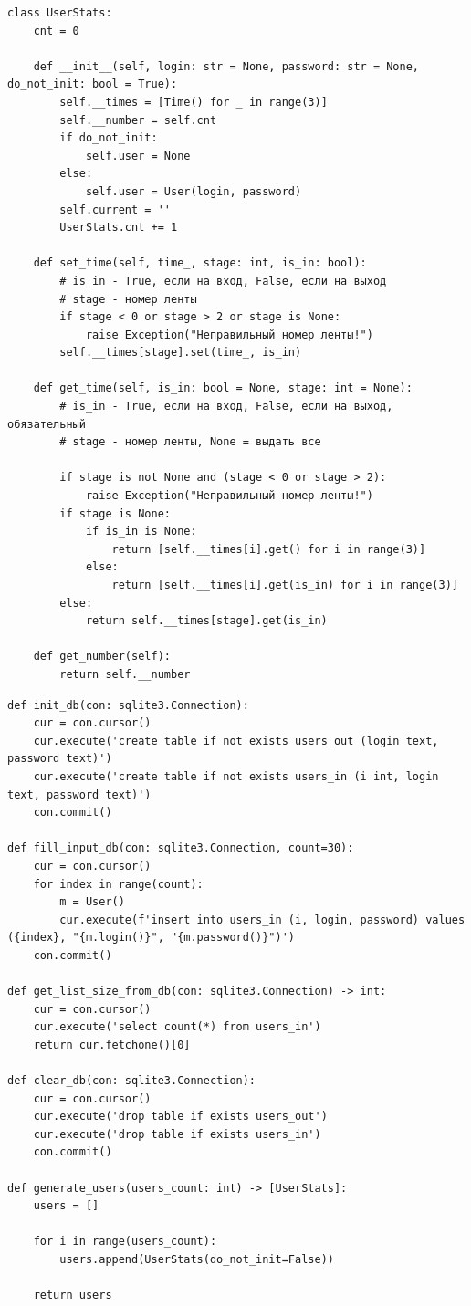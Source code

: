 \documentclass[a4paper,oneside,14pt]{extreport}
\begin{document}
\newpage
\begin{lstlisting}[caption=Класс UserStats]
class UserStats:
	cnt = 0

	def __init__(self, login: str = None, password: str = None, 	do_not_init: bool = True):
		self.__times = [Time() for _ in range(3)]
		self.__number = self.cnt
		if do_not_init:
			self.user = None
		else:
			self.user = User(login, password)
		self.current = ''
		UserStats.cnt += 1

	def set_time(self, time_, stage: int, is_in: bool):
		# is_in - True, если на вход, False, если на выход
		# stage - номер ленты
		if stage < 0 or stage > 2 or stage is None:
			raise Exception("Неправильный номер ленты!")
		self.__times[stage].set(time_, is_in)

	def get_time(self, is_in: bool = None, stage: int = None):
		# is_in - True, если на вход, False, если на выход, обязательный
		# stage - номер ленты, None = выдать все

		if stage is not None and (stage < 0 or stage > 2):
			raise Exception("Неправильный номер ленты!")
		if stage is None:
			if is_in is None:
				return [self.__times[i].get() for i in range(3)]
			else:
				return [self.__times[i].get(is_in) for i in range(3)]
		else:
			return self.__times[stage].get(is_in)

	def get_number(self):
		return self.__number
\end{lstlisting}
\newpage
\begin{lstlisting}[caption=Файл master.py (часть 1)]
def init_db(con: sqlite3.Connection):
	cur = con.cursor()
	cur.execute('create table if not exists users_out (login text, password text)')
	cur.execute('create table if not exists users_in (i int, login text, password text)')
	con.commit()

def fill_input_db(con: sqlite3.Connection, count=30):
	cur = con.cursor()
	for index in range(count):
		m = User()
		cur.execute(f'insert into users_in (i, login, password) values ({index}, "{m.login()}", "{m.password()}")')
	con.commit()

def get_list_size_from_db(con: sqlite3.Connection) -> int:
	cur = con.cursor()
	cur.execute('select count(*) from users_in')
	return cur.fetchone()[0]

def clear_db(con: sqlite3.Connection):
	cur = con.cursor()
	cur.execute('drop table if exists users_out')
	cur.execute('drop table if exists users_in')
	con.commit()

def generate_users(users_count: int) -> [UserStats]:
	users = []

	for i in range(users_count):
		users.append(UserStats(do_not_init=False))

	return users
\end{lstlisting}
\end{document}
